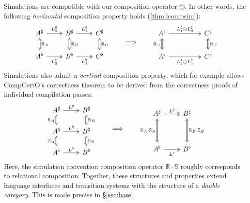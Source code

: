 \documentclass[acmsmall,screen,review,anonymous]{acmart}
\begin{document}
Simulations are compatible with our composition operator $\odot$.
In other words, the following \emph{horizontal} composition property holds
(\autoref{thm:lcompsim}):
\[
  \begin{tikzcd}
    A^\sharp \ar[r, twoheadrightarrow, "L_2^\sharp"]
             \ar[d, Leftrightarrow, "\mathbb{R}_A"] &
    B^\sharp \ar[r, twoheadrightarrow, "L_1^\sharp"]
             \ar[d, Leftrightarrow, "\mathbb{R}_B"] &
    C^\sharp \ar[d, Leftrightarrow, "\mathbb{R}_C"]
    \\
    A^\flat \ar[r, twoheadrightarrow, "L_2^\flat"'] &
    B^\flat \ar[r, twoheadrightarrow, "L_1^\flat"'] &
    C^\flat
  \end{tikzcd}
  \qquad \Longrightarrow \qquad
  \begin{tikzcd}
    A^\sharp \ar[rr, twoheadrightarrow, "L_1^\sharp \odot L_2^\sharp"]
             \ar[d, Leftrightarrow, "\mathbb{R}_A"'] & &
    C^\sharp \ar[d, Leftrightarrow, "\mathbb{R}_C"]
    \\
    A^\flat \ar[rr, twoheadrightarrow, "L_2^\flat \odot L_1^\flat"'] & &
    C^\flat
  \end{tikzcd}
\]
Simulations also admit a \emph{vertical} composition property,
which for example allows CompCertO's correctness theorem
to be derived from the correctness proofs of
individual compilation passes:
\[
  \begin{tikzcd}[row sep=1.5em]
    A^\sharp \ar[r, twoheadrightarrow, "L^\sharp"]
	     \ar[d, Leftrightarrow, "\mathbb{R}_A"'] &
    B^\sharp \ar[d, Leftrightarrow, "\mathbb{R}_B"]
    \\
    A^\natural \ar[r, twoheadrightarrow, "L^\natural"]
	     \ar[d, Leftrightarrow, "\mathbb{S}_A"'] &
    B^\natural \ar[d, Leftrightarrow, "\mathbb{S}_B"]
    \\
    A^\flat \ar[r, twoheadrightarrow, "L^\flat"] &
    B^\flat
  \end{tikzcd}
  \qquad \Longrightarrow \qquad
  \begin{tikzcd}
    A^\sharp \ar[r, twoheadrightarrow, "L^\sharp"]
             \ar[dd, Leftrightarrow, "\mathbb{R}_A \cdot \mathbb{S}_A"'] &
    B^\sharp \ar[dd, Leftrightarrow, "\mathbb{R}_B \cdot \mathbb{S}_B"] \\ \\
    A^\flat \ar[r, twoheadrightarrow, "L^\flat"'] &
    B^\flat
  \end{tikzcd}
\]
Here,
the simulation convention composition operator $\mathbb{R} \cdot \mathbb{S}$
roughly corresponds to relational composition.
Together,
these structures and properties
extend language interfaces and transition systems
with the structure of a \emph{double category}.
This is made precise in \S\ref{sec:base}.
\end{document}
